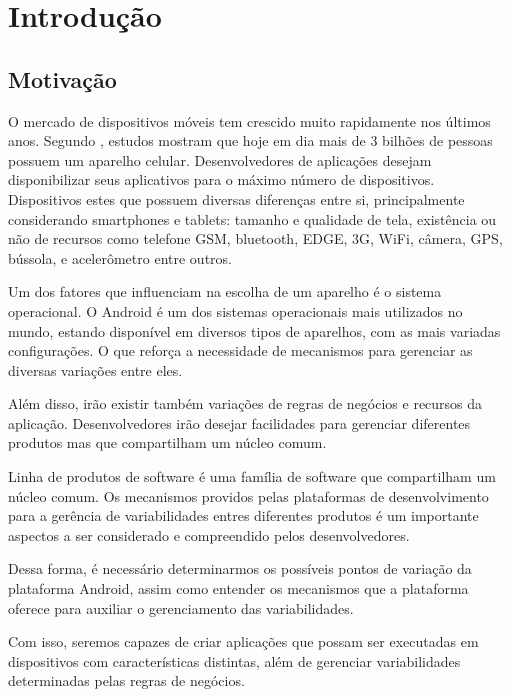 \chapter{Introdução}

\section{Motivação}
O mercado de dispositivos móveis tem crescido muito rapidamente nos últimos anos.
Segundo \cite{lecheta}, estudos mostram que hoje em dia mais de 3 bilhões
de pessoas possuem um aparelho celular.
 Desenvolvedores
de aplicações desejam disponibilizar seus aplicativos para o máximo número de 
dispositivos. Dispositivos estes que possuem diversas diferenças entre si, 
principalmente considerando smartphones e tablets: tamanho e qualidade de tela, 
existência ou não de recursos como telefone GSM, bluetooth, EDGE, 3G, WiFi, câmera, 
GPS, bússola, e acelerômetro entre outros.

Um dos fatores que influenciam na escolha de um aparelho é o sistema operacional.
O Android é um dos sistemas operacionais mais utilizados no mundo, estando 
disponível em diversos tipos de aparelhos, com as mais variadas configurações.
O que reforça a necessidade de mecanismos para gerenciar as diversas variações entre 
eles.

Além disso, irão existir também variações de regras de negócios e recursos da aplicação.
Desenvolvedores irão desejar facilidades para gerenciar diferentes produtos mas que 
compartilham um núcleo comum.

Linha de produtos de software é uma família de software que compartilham um núcleo 
comum. Os mecanismos providos pelas plataformas de desenvolvimento para a gerência 
de variabilidades entres diferentes produtos é um importante aspectos a ser considerado
e compreendido pelos desenvolvedores.

Dessa forma, é necessário determinarmos os possíveis pontos 
de variação da plataforma Android, assim como entender os mecanismos que a plataforma 
oferece para auxiliar o gerenciamento das variabilidades.

Com isso, seremos capazes de criar aplicações que possam ser executadas em dispositivos
com características distintas, além de gerenciar variabilidades determinadas pelas 
regras de negócios.

